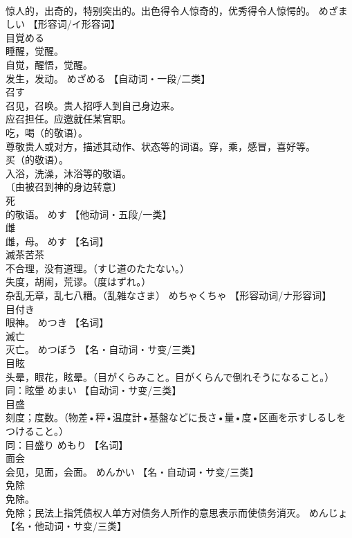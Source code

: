 \documentclass[8pt]{extreport}
\begin{document}
\begin{CJK}{UTF8}{min}
\\	惊人的，出奇的，特别突出的。出色得令人惊奇的，优秀得令人惊愕的。	めざましい		【形容词/イ形容词】
\\	目覚める	
\\	睡醒，觉醒。 
\\	自觉，醒悟，觉醒。 
\\	发生，发动。	めざめる		【自动词・一段/二类】
\\	召す	
\\	召见，召唤。贵人招呼人到自己身边来。 
\\	应召担任。应邀就任某官职。 
\\	吃，喝（的敬语）。 
\\	尊敬贵人或对方，描述其动作、状态等的词语。穿，乘，感冒，喜好等。 
\\	买（的敬语）。 
\\	入浴，洗澡，沐浴等的敬语。 
\\	〔由被召到神的身边转意〕
\\	死
\\	的敬语。	めす		【他动词・五段/一类】
\\	雌	
\\	雌，母。	めす		【名词】
\\	滅茶苦茶	
\\	不合理，没有道理。（すじ道のたたない。） 
\\	失度，胡闹，荒谬。（度はずれ。） 
\\	杂乱无章，乱七八糟。（乱雑なさま）	めちゃくちゃ		【形容动词/ナ形容词】
\\	目付き	
\\	眼神。	めつき		【名词】
\\	滅亡	
\\	灭亡。	めつぼう		【名・自动词・サ变/三类】
\\	目眩	
\\	头晕，眼花，眩晕。（目がくらみこと。目がくらんで倒れそうになること。） 
\\	同：眩暈	めまい		【自动词・サ变/三类】
\\	目盛	
\\	刻度；度数。（物差•秤•温度計•基盤などに長さ•量•度•区画を示すしるしをつけること。） 
\\	同：目盛り	めもり		【名词】
\\	面会	
\\	会见，见面，会面。	めんかい		【名・自动词・サ变/三类】
\\	免除	
\\	免除。 
\\	免除；民法上指凭债权人单方对债务人所作的意思表示而使债务消灭。	めんじょ		【名・他动词・サ变/三类】

\end{CJK}
\end{document}
